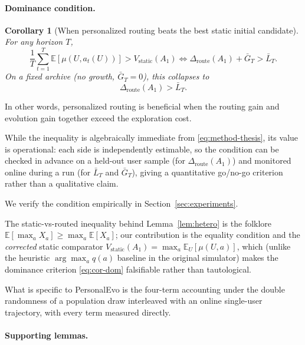 \documentclass{article} %
\newtheorem{corollary}[theorem]{Corollary}
\providecommand{\E}{\mathbb{E}}
\begin{document}
\paragraph{Dominance condition.}

\label{sec:method-cor-dom}

\begin{corollary}[When personalized routing beats the best static initial candidate]
\label{cor:dominance}
For any horizon $T$,
\begin{equation}
\label{eq:cor-dom}
\frac{1}{T}\sum_{t=1}^T \E[\mu(U, a_t(U))] > V_{\mathrm{static}}(A_1)
\iff
\Delta_{\mathrm{route}}(A_1) + \bar G_T > \bar L_T.
\end{equation}
On a fixed archive (no growth, $\bar G_T = 0$), this collapses to
\begin{equation}
\label{eq:cor-dom-fixed}
\Delta_{\mathrm{route}}(A_1) > \bar L_T.
\end{equation}
\end{corollary}

In other words, personalized routing is beneficial when the routing gain and evolution gain together exceed the exploration cost.

While the inequality is algebraically immediate from \eqref{eq:method-thesis}, its value is operational: each side is independently estimable, so the condition can be checked in advance on a held-out user sample (for $\Delta_{\mathrm{route}}(A_1)$) and monitored online during a run (for $\bar L_T$ and $\bar G_T$), giving a quantitative go/no-go criterion rather than a qualitative claim.

We verify the condition empirically in Section~\ref{sec:experiments}.

The static-vs-routed inequality behind Lemma~\ref{lem:hetero} is the folklore $\E[\max_a X_a]\ge\max_a\E[X_a]$; our contribution is the equality condition and the \emph{corrected} static comparator $V_{\mathrm{static}}(A_1)=\max_a\E_U[\mu(U,a)]$, which (unlike the heuristic $\arg\max_a q(a)$ baseline in the original simulator) makes the dominance criterion \eqref{eq:cor-dom} falsifiable rather than tautological.

What is specific to PersonalEvo is the four-term accounting under the double randomness of a population draw interleaved with an online single-user trajectory, with every term measured directly.

\paragraph{Supporting lemmas.}
\end{document}
